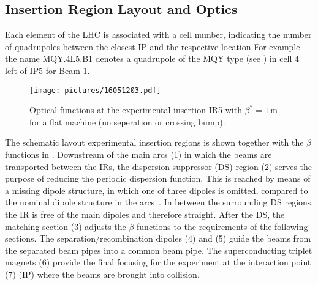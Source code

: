 \subsection{Insertion Region Layout and Optics}


Each element of the LHC is associated with a cell number, indicating the number of quadrupoles between the closest IP and the respective location For example the name MQY.4L5.B1 denotes a quadrupole of the MQY type (see \cite{CERN-2004-003-V1}) in cell 4 left of IP5 for Beam 1. 
%
\begin{figure}[b]  
    \centering
    \texttt{[image: pictures/16051203.pdf]}
    \caption{Optical functions at the experimental insertion IR5 with $\beta^*=1\,$m for a flat machine (no seperation or crossing bump).}  
    \label{pic:16051202}
\end{figure}
%
The schematic layout experimental insertion regions is shown together with the $\beta$ functions in . Downstream of the main arcs (1) in which the beams are transported between the IRs, the dispersion suppressor (DS) region (2) serves the purpose of reducing the periodic dispersion function. This is reached by means of a missing dipole structure, in which one of three dipoles is omitted, compared to the nominal dipole structure in the arcs~\citedr. In between the surrounding DS regions, the IR is free of the main dipoles and therefore straight. After the DS, the matching section (3) adjusts the $\beta$ functions to the requirements of the following sections. The separation/recombination dipoles (4) and (5) guide the beams from the separated beam pipes into a common beam pipe. The superconducting triplet magnets (6) provide the final focusing for the experiment at the interaction point (7) (IP) where the beams are brought into collision.

